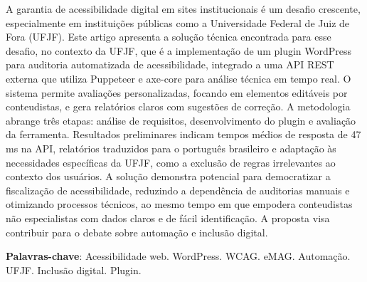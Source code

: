 \documentclass[
	article,			%
	12pt,				%
	oneside,			%
	a4paper,			%
	section=TITLE,		%
	subsection=TITLE,	%
	english,			%
	brazil,				%
	sumario=tradicional
	]{abntex2}
\begin{document}

\frenchspacing


%
%

\maketitle
\thispagestyle{empty}





\begin{resumoumacoluna}
    A garantia de acessibilidade digital em sites institucionais é um desafio
    crescente, especialmente em instituições públicas como a Universidade Federal
    de Juiz de Fora (UFJF). Este artigo apresenta a solução
    técnica encontrada para esse desafio, no contexto da UFJF, que é a
    implementação de um plugin WordPress para auditoria automatizada de acessibilidade,
    integrado a uma API REST externa que utiliza Puppeteer e axe-core para análise
    técnica em tempo real. O sistema permite avaliações personalizadas, focando em
    elementos editáveis por conteudistas, e gera relatórios claros com sugestões de
    correção. A metodologia abrange três etapas: análise de requisitos,
    desenvolvimento do plugin e avaliação da ferramenta. Resultados preliminares
    indicam tempos médios de resposta de 47 ms na API, relatórios traduzidos para o
    português brasileiro e adaptação às necessidades específicas da UFJF, como a
    exclusão de regras irrelevantes ao contexto dos usuários. A solução demonstra
    potencial para democratizar a fiscalização de acessibilidade, reduzindo a
    dependência de auditorias manuais e otimizando processos técnicos, ao mesmo tempo em 
    que empodera conteudistas não especialistas com dados claros e de fácil
    identificação. A proposta visa contribuir para o debate sobre automação e
    inclusão digital.

    \vspace{\onelineskip}

    \noindent
    \textbf{Palavras-chave}: Acessibilidade web. WordPress. WCAG. eMAG. Automação. UFJF. Inclusão digital. Plugin.
    \vspace{\onelineskip}
\end{resumoumacoluna}
\end{document}
